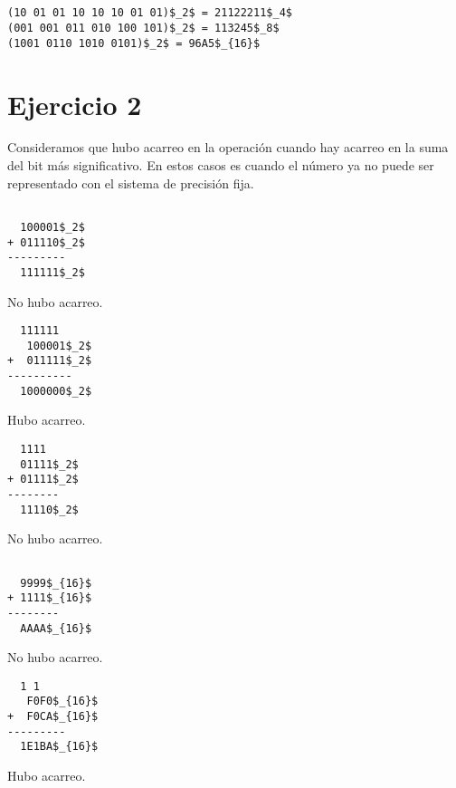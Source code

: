 \subsection{}

\begin{lstlisting}
(10 01 01 10 10 10 01 01)$_2$ = 21122211$_4$
(001 001 011 010 100 101)$_2$ = 113245$_8$
(1001 0110 1010 0101)$_2$ = 96A5$_{16}$
\end{lstlisting}

\section{Ejercicio 2}

Consideramos que hubo acarreo en la operación cuando hay acarreo en la suma del bit más significativo. En estos casos es cuando el número ya no puede ser representado con el sistema de precisión fija.

\begin{multicols}{5}

\begin{lstlisting}

  100001$_2$
+ 011110$_2$
---------
  111111$_2$
\end{lstlisting}
No hubo acarreo.

\columnbreak

\begin{lstlisting}
  111111
   100001$_2$
+  011111$_2$
----------
  1000000$_2$
\end{lstlisting}
Hubo acarreo.

\columnbreak

\begin{lstlisting}
  1111
  01111$_2$
+ 01111$_2$
--------
  11110$_2$
\end{lstlisting}
No hubo acarreo.

\columnbreak

\begin{lstlisting}

  9999$_{16}$
+ 1111$_{16}$
--------
  AAAA$_{16}$
\end{lstlisting}
No hubo acarreo.

\columnbreak

\begin{lstlisting}
  1 1
   F0F0$_{16}$
+  F0CA$_{16}$
---------
  1E1BA$_{16}$
\end{lstlisting}
Hubo acarreo.

\end{multicols}

